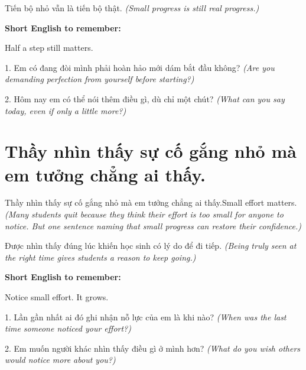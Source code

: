 \begin{baihoc}
Tiến bộ nhỏ vẫn là tiến bộ thật.
\textit{(Small progress is still real progress.)}
\end{baihoc}

\begin{ghinhoanh}
\textbf{Short English to remember:}

Half a step still matters.

\end{ghinhoanh}

\begin{tuhocnhanh}
1. Em có đang đòi mình phải hoàn hảo mới dám bắt đầu không? \textit{(Are you demanding perfection from yourself before starting?)}

2. Hôm nay em có thể nói thêm điều gì, dù chỉ một chút? \textit{(What can you say today, even if only a little more?)}
\end{tuhocnhanh}
\ngancach


\section{Thầy nhìn thấy sự cố gắng nhỏ mà em tưởng chẳng ai thấy.}
\begin{truyen}{Thầy nhìn thấy sự cố gắng nhỏ mà em tưởng chẳng ai thấy.}{Small effort matters.}
\textit{(Many students quit because they think their effort is too small for anyone to notice. But one sentence naming that small progress can restore their confidence.)}
\end{truyen}

\begin{baihoc}
Được nhìn thấy đúng lúc khiến học sinh có lý do để đi tiếp.
\textit{(Being truly seen at the right time gives students a reason to keep going.)}
\end{baihoc}

\begin{ghinhoanh}
\textbf{Short English to remember:}

Notice small effort. It grows.

\end{ghinhoanh}

\begin{tuhocnhanh}
1. Lần gần nhất ai đó ghi nhận nỗ lực của em là khi nào? \textit{(When was the last time someone noticed your effort?)}

2. Em muốn người khác nhìn thấy điều gì ở mình hơn? \textit{(What do you wish others would notice more about you?)}
\end{tuhocnhanh}
\ngancach


